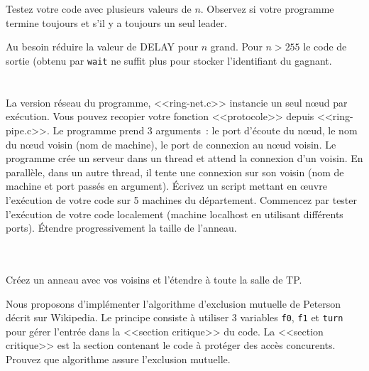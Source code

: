 \documentclass{exam}
\begin{document}
\begin{questions}
\begin{parts}
  \part{} Testez votre code avec plusieurs valeurs de $n$. Observez si
  votre programme termine toujours et s'il y a toujours un seul
  leader.
  \begin{solution}
    Au besoin réduire la valeur de DELAY pour $n$ grand.  Pour $n>255$
    le code de sortie (obtenu par \texttt{wait} ne suffit plus pour
    stocker l'identifiant du gagnant.
  \end{solution}
  \part{} La version réseau du programme, <<ring-net.c>> instancie un
  seul n\oe{}ud par exécution. Vous pouvez recopier votre fonction
  <<protocole>> depuis <<ring-pipe.c>>.
  Le programme prend 3 arguments~: le port d'écoute du n\oe{}ud, le nom du nœud voisin (nom de
  machine), le port de connexion au nœud voisin. Le programme crée un
  serveur dans un thread et attend la connexion d'un voisin. En
  parallèle, dans un autre thread, il tente une connexion sur son
  voisin (nom de machine et port passés en argument). Écrivez un
  script mettant en œuvre l'exécution de votre code sur 5 machines du
  département. Commencez par tester l'exécution de votre code
  localement (machine localhost en utilisant différents
  ports). Étendre progressivement la taille de l'anneau.
  \begin{solution}
    \inputminted{C}{correc/ring/ring-net.c}
  \end{solution}
  \part{} Créez un anneau avec vos voisins et l'étendre à toute la
  salle de TP.
\end{parts}

Nous proposons d'implémenter l'algorithme d'exclusion mutuelle de Peterson décrit sur Wikipedia.
Le principe consiste à utiliser 3 variables \texttt{f0}, \texttt{f1} et \texttt{turn} pour gérer l'entrée dans la <<section critique>> du code.
La <<section critique>> est la section contenant le code à protéger des accès concurents.
Prouvez que algorithme assure l'exclusion mutuelle.
\begin{parts}

\end{parts}
\end{questions}
\end{document}
